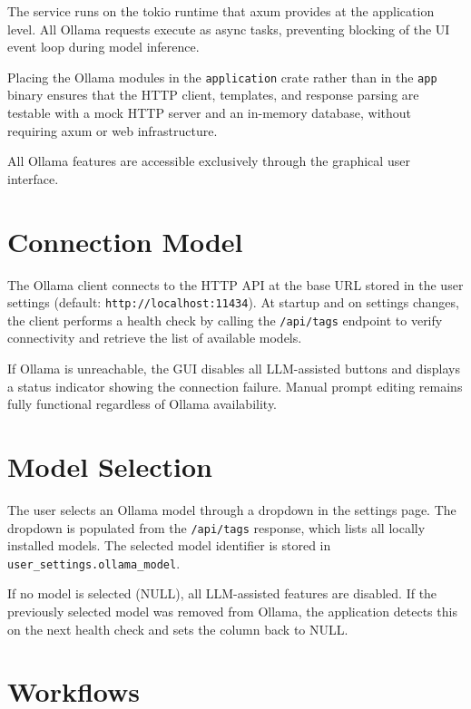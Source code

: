 \documentclass[a4paper, 11pt, oneside]{report}
\begin{document}
The service runs on the tokio runtime that axum provides at the
application level.  All Ollama requests execute as async tasks,
preventing blocking of the UI event loop during model inference.

Placing the Ollama modules in the \texttt{application} crate rather than
in the \texttt{app} binary ensures that the HTTP client, templates, and
response parsing are testable with a mock HTTP server and an in-memory
database, without requiring axum or web infrastructure.

All Ollama features are accessible exclusively through the graphical
user interface.

\section{Connection Model}
\label{sec:ollama-connection}

{\relax
The Ollama client connects to the HTTP API at the base URL stored in
the user settings (default: \texttt{http://localhost:11434}).
At startup and on settings changes, the client performs a health check by
calling the \texttt{/api/tags} endpoint to verify connectivity and
retrieve the list of available models.
}

If Ollama is unreachable, the GUI disables all LLM-assisted buttons and
displays a status indicator showing the connection failure.  Manual
prompt editing remains fully functional regardless of Ollama availability.

\section{Model Selection}
\label{sec:ollama-model}

The user selects an Ollama model through a dropdown in the settings page.
The dropdown is populated from the \texttt{/api/tags} response, which
lists all locally installed models.  The selected model identifier is
stored in \texttt{user\_settings.ollama\_model}.

If no model is selected (NULL), all LLM-assisted features are
disabled.  If the previously selected model was removed from Ollama, the
application detects this on the next health check and sets the column
back to NULL.

\section{Workflows}
\label{sec:ollama-workflows}
\end{document}

